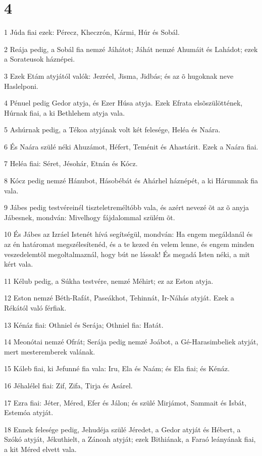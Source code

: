 \chapter{4}

\par 1 Júda fiai ezek: Pérecz, Kheczrón, Kármi, Húr és Sobál.
\par 2 Reája pedig, a Sobál fia nemzé Jáhátot; Jáhát nemzé Ahumáit és Lahádot; ezek a Sorateusok háznépei.
\par 3 Ezek Etám atyjától valók: Jezréel, Jisma, Jidbás; és az õ hugoknak neve Haslelponi.
\par 4 Pénuel pedig Gedor atyja, és Ezer Húsa atyja. Ezek Efrata elsõszülöttének, Húrnak fiai, a ki Bethlehem atyja vala.
\par 5 Ashúrnak pedig, a Tékoa atyjának volt két felesége, Heléa és Naára.
\par 6 És Naára szülé néki Ahuzámot, Héfert, Teménit és Ahastárit. Ezek a Naára fiai.
\par 7 Heléa fiai: Séret, Jésohár, Etnán és Kócz.
\par 8 Kócz pedig nemzé Hánubot, Hásobébát és Ahárhel háznépét, a ki Hárumnak fia vala.
\par 9 Jábes pedig testvéreinél tiszteletreméltóbb vala, és azért nevezé õt az õ anyja Jábesnek, mondván: Mivelhogy fájdalommal szülém õt.
\par 10 És Jábes az Izráel Istenét hívá segítségül, mondván: Ha engem megáldanál és az én határomat megszélesítenéd, és a te kezed én velem lenne, és engem minden veszedelemtõl megoltalmaznál, hogy bút ne lássak! És megadá Isten néki, a mit kért vala.
\par 11 Kélub pedig, a Súkha testvére, nemzé Méhirt; ez az Eston atyja.
\par 12 Eston nemzé Béth-Rafát, Paseákhot, Tehinnát, Ir-Náhás atyját. Ezek a Rékától való férfiak.
\par 13 Kénáz fiai: Othniel és Serája; Othniel fia: Hatát.
\par 14 Meonótai nemzé Ofrát; Serája pedig nemzé Joábot, a Gé-Harasimbeliek atyját, mert mesteremberek valának.
\par 15 Káleb fiai, ki Jefunné fia vala: Iru, Ela és Naám; és Ela fiai; és Kénáz.
\par 16 Jéhalélel fiai: Zif, Zifa, Tirja és Asárel.
\par 17 Ezra fiai: Jéter, Méred, Efer és Jálon; és szülé Mirjámot, Sammait és Isbát, Estemóa atyját.
\par 18 Ennek felesége pedig, Jehudéja szülé Jéredet, a Gedor atyját és Hébert, a Szókó atyját, Jékuthielt, a Zánoah atyját; ezek Bithiának, a Faraó leányának fiai, a kit Méred elvett vala.
